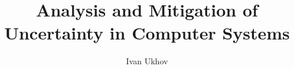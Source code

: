 \documentclass{thesis}
\title{
  Analysis and Mitigation of\\[0.3em]
  Uncertainty in Computer Systems
}
\author{Ivan Ukhov}
\begin{document}
\nocite{ukhov2012, ukhov2014a, ukhov2014b, ukhov2015, ukhov2017}




\printbibliography
\end{document}
